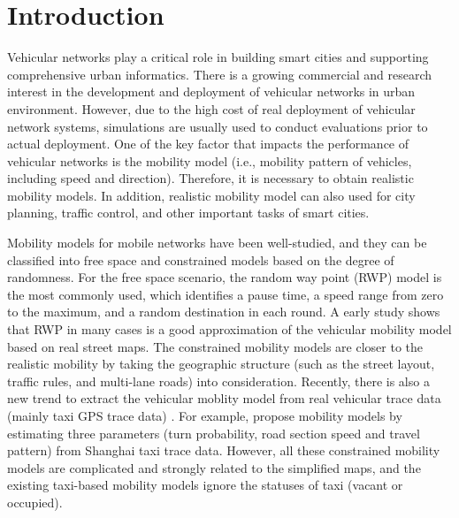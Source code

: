 \section{Introduction}
\label{section_introduction}

Vehicular networks play a critical role in building smart cities and supporting comprehensive urban informatics. There is a growing commercial and research interest in the development and deployment of vehicular networks in urban environment. However, due to the high cost of real deployment of vehicular network systems, simulations are usually used to conduct evaluations prior to actual deployment. One of the key factor that impacts the performance of vehicular networks is the mobility model (i.e., mobility pattern of vehicles, including speed and direction). Therefore, it is necessary to obtain realistic mobility models. In addition, realistic mobility model can also used for city planning, traffic control, and other important tasks of smart cities.

Mobility models for mobile networks \cite{LuChen-104,AhmedKarmakar-106} have been well-studied, and they can be classified into free space and constrained models based on the degree of randomness.
For the free space scenario, the random way point (RWP) model \cite{broch1998performance} is the most commonly used, which identifies a pause time, a speed range from zero to the maximum, and a random destination in each round. A early study \cite{SahaJohnson-91} shows that RWP in many cases is a good approximation of the vehicular mobility model based on real street maps. The constrained mobility models \cite{SahaJohnson-91,MartinezCano-87,ChoffnesBustamante-93}  are closer to the realistic mobility by taking the geographic structure (such as the street layout, traffic rules, and multi-lane roads) into consideration. Recently, there is also a new trend to extract the vehicular moblity model from real vehicular trace data (mainly taxi GPS trace data) \cite{KimKotz-99,HuangZhu-88}. For example, \cite{HuangZhu-88} propose mobility models by estimating three parameters (turn probability, road section speed and travel pattern) from Shanghai taxi trace data. However, all these constrained mobility models are complicated and strongly related to the simplified maps, and the existing taxi-based mobility models ignore the statuses of taxi (vacant or occupied). 

